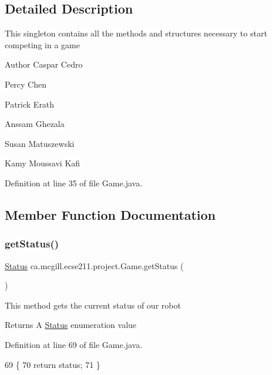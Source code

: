 \subsection{Detailed Description}
This singleton contains all the methods and structures necessary to start competing in a game

\begin{DoxyAuthor}{Author}
Caspar Cedro 

Percy Chen 

Patrick Erath 

Anssam Ghezala 

Susan Matuszewski 

Kamy Moussavi Kafi 
\end{DoxyAuthor}


Definition at line 35 of file Game.\+java.



\subsection{Member Function Documentation}
\mbox{\label{enumca_1_1mcgill_1_1ecse211_1_1project_1_1_game_a620374b3eeb3dd7e0abd26f3ced9053b}} 
\subsubsection{\texorpdfstring{get\+Status()}{getStatus()}}
{\footnotesize\ttfamily \hyperlink{enumca_1_1mcgill_1_1ecse211_1_1project_1_1_game_1_1_status}{Status} ca.\+mcgill.\+ecse211.\+project.\+Game.\+get\+Status (\begin{DoxyParamCaption}{ }\end{DoxyParamCaption})}

This method gets the current status of our robot

\begin{DoxyReturn}{Returns}
A \hyperlink{enumca_1_1mcgill_1_1ecse211_1_1project_1_1_game_1_1_status}{Status} enumeration value 
\end{DoxyReturn}


Definition at line 69 of file Game.\+java.


\begin{DoxyCode}
69                             \{
70     \textcolor{keywordflow}{return} status;
71   \}
\end{DoxyCode}
\mbox{\label{enumca_1_1mcgill_1_1ecse211_1_1project_1_1_game_a43a5763d183e0bcacd402c872c07273e}} 
